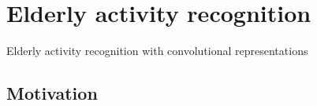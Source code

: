\section{Elderly activity recognition}

\begingroup
{}  %
\begin{frame}[noframenumbering]{}
    \centering
    \vspace{3cm}
    \Huge
    \textcolor{myblue}{Elderly activity recognition with convolutional representations}
\end{frame}
\endgroup


\subsection{Motivation}

